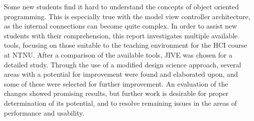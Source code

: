 Some new students find it hard to understand the concepts of object oriented programming.
This is especially true with the model view controller architecture, as the internal connections can become quite complex.
In order to assist new students with their comprehension, this report investigates multiple available tools, focusing on those suitable to the teaching environment for the HCI course at NTNU.
After a comparison of the available tools, JIVE was chosen for a detailed study.
Through the use of a modified design science approach, several areas with a potential for improvement were found and elaborated upon, and some of these were selected for further improvement.
An evaluation of the changes showed promising results, but further work is desirable for proper determination of its potential, and to resolve remaining issues in the areas of performance and usability.